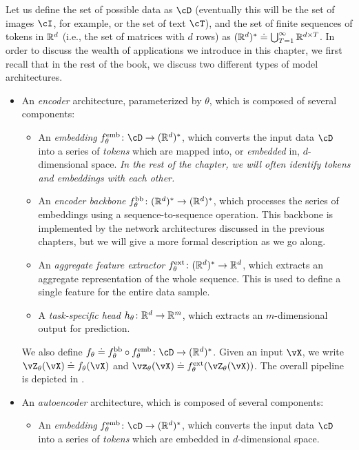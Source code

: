 \documentclass[../../book-main.tex]{subfiles}
\begin{document}
Let us define the set of possible data as \(\cD\) (eventually this will be the set of images \(\cI\), for example, or the set of text \(\cT\)), and the set of finite sequences of tokens in \(\mathbb{R}^{d}\) (i.e., the set of matrices with \(d\) rows) as \((\mathbb{R}^{d})^{*} \doteq \bigcup_{T = 1}^{\infty}\mathbb{R}^{d \times T}\). In order to discuss the wealth of applications we introduce in this chapter, we first recall that in the rest of the book, we discuss two different types of model architectures.
\begin{itemize}
    \item An \textit{encoder} architecture, parameterized by \(\theta\), which is composed of several components:
    \begin{itemize}
        \item An \textit{embedding} \(f_{\theta}^{\emb} \colon \cD \to (\R^{d})^{*}\), which converts the input data \(\cD\) into a series of \textit{tokens} which are mapped into, or \textit{embedded} in, \(d\)-dimensional space. \textit{In the rest of the chapter, we will often identify tokens and embeddings with each other.}
        \item An \textit{encoder backbone} \(f_{\theta}^{\mathrm{bb}} \colon (\mathbb{R}^{d})^{*} \to (\mathbb{R}^{d})^{*}\), which processes the series of embeddings using a sequence-to-sequence operation. This backbone is implemented by the network architectures discussed in the previous chapters, but we will give a more formal description as we go along.
        \item An \textit{aggregate feature extractor} \(f_{\theta}^{\mathrm{ext}} \colon (\mathbb{R}^{d})^{*} \to \mathbb{R}^{d}\), which extracts an aggregate representation of the whole sequence. This is used to define a single feature for the entire data sample.
        \item A \textit{task-specific head} \(h_{\theta} \colon \mathbb{R}^{d} \to \mathbb{R}^{m}\), which extracts an \(m\)-dimensional output for prediction.
    \end{itemize}
    We also define \(f_{\theta} \doteq f_{\theta}^{\backbone} \circ f_{\theta}^{\emb} \colon \cD \to (\R^{d})^{*}\). Given an input \(\vX\), we write \(\vZ_{\theta}(\vX) \doteq f_{\theta}(\vX)\) and \(\vz_{\theta}(\vX) \doteq f_{\theta}^{\ext}(\vZ_{\theta}(\vX))\). The overall pipeline is depicted in .
    \item An \textit{autoencoder} architecture, which is composed of several components:
    \begin{itemize}
        \item An \textit{embedding} \(f_{\theta}^{\emb} \colon \cD \to (\R^{d})^{*}\), which converts the input data \(\cD\) into a series of \textit{tokens} which are embedded in \(d\)-dimensional space.

\end{itemize}
\end{itemize}
\end{document}

